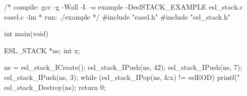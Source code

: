 \begin{cchunk}
/* compile: gcc -g -Wall -I. -o example -DeslSTACK_EXAMPLE esl_stack.c easel.c -lm
 * run:     ./example
 */
#include "easel.h"
#include "esl_stack.h"

int
main(void)
{
  ESL_STACK *ns;
  int        x;

  ns = esl_stack_ICreate();
  esl_stack_IPush(ns, 42);
  esl_stack_IPush(ns, 7);
  esl_stack_IPush(ns, 3);
  while (esl_stack_IPop(ns, &x) != eslEOD) 
    printf("%
  esl_stack_Destroy(ns);   
  return 0;
}
\end{cchunk}
